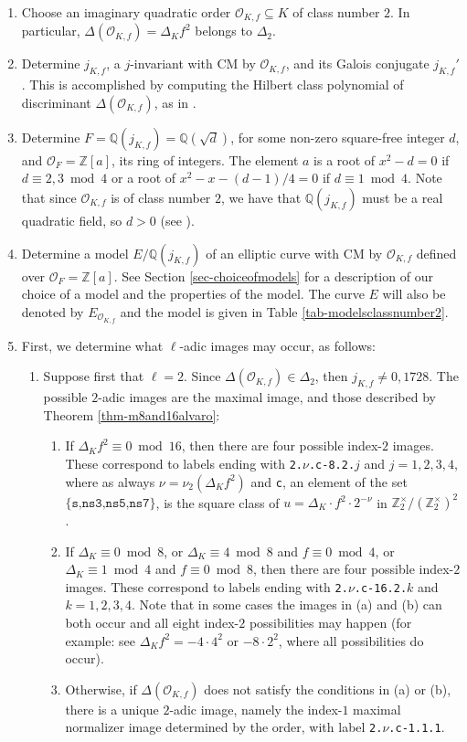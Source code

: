 \documentclass[11pt]{amsart}
\theoremstyle{definition}
\newcommand{\Q}{\mathbb Q}
\newcommand{\Z}{\mathbb Z}
\newcommand{\OF}{\mathcal{O}_F}
\newcommand{\Of}{\mathcal{O}_{K,f}}
\begin{document}
\begin{enumerate}
    \item Choose an imaginary quadratic order $\Of\subseteq K$ of class number $2$. In particular, $\Delta(\Of)=\Delta_K f^2$ belongs to $\Delta_2$.
    \item Determine $j_{K,f}$, a $j$-invariant with CM by $\Of$, and its Galois conjugate $j_{K,f}'$. This is accomplished by computing the Hilbert class polynomial of discriminant $\Delta(\Of)$, as in \cite[Section 7.6.2]{cohen}. 
    \item Determine $F=\Q(j_{K,f})=\Q(\sqrt{d})$, for some non-zero square-free integer $d$, and $\OF = \Z[a]$, its ring of integers. The element $a$ is a root of $x^2-d=0$ if $d\equiv 2,3\bmod 4$ or a root of $x^2-x-(d-1)/4=0$ if $d\equiv 1 \bmod 4$. Note that since $\Of$ is of class number $2$, we have that $\Q(j_{K,f})$ must be a real quadratic field, so $d > 0$ (see \cite[Exercise 2.9]{silverman2}).
    \item Determine a model $E/\Q(j_{K,f})$ of an elliptic curve with CM by $\Of$ defined over $\OF=\Z[a]$. See Section \ref{sec-choiceofmodels} for a description of our choice of a model and the properties of the model. The curve $E$ will also be denoted by $E_{\Of}$ and the model is given in Table \ref{tab-modelsclassnumber2}.
    \item First, we determine what $\ell$-adic images may occur, as follows:
    \begin{enumerate} 
    \item Suppose first that $\ell=2$. Since $\Delta(\Of)\in \Delta_2$, then $j_{K,f}\neq 0,1728$. The possible $2$-adic images are the maximal image, and those described by Theorem \ref{thm-m8and16alvaro}:
    \begin{enumerate}
        \item If $\Delta_K f^2 \equiv 0 \bmod 16$, then there are four possible index-$2$ images. These correspond to labels ending with \texttt{2.$\nu$.c-8.2.$j$} and $j=1,2,3,4$, where as always $\nu=\nu_2(\Delta_K f^2)$ and \texttt{c}, an element of the set $\{\texttt{s,ns3,ns5,ns7}\}$, is the square class of $u=\Delta_K\cdot f^2\cdot 2^{-\nu}$ in $\Z_2^\times/(\Z_2^\times)^2$.
        \item If $\Delta_K\equiv 0 \bmod 8$, or $\Delta_K\equiv 4 \bmod 8$ and $f\equiv 0 \bmod 4$, or $\Delta_K\equiv 1 \bmod 4$ and $f\equiv 0 \bmod 8$, then there are four possible index-$2$ images. These correspond to labels ending with \texttt{2.$\nu$.c-16.2.$k$} and $k=1,2,3,4$. Note that in some cases the images in (a) and (b) can both occur and all eight index-$2$ possibilities may happen (for example: see $\Delta_K f^2=-4\cdot 4^2$ or $-8\cdot 2^2$, where all possibilities do occur).
        \item Otherwise, if $\Delta(\Of)$ does not satisfy the conditions in (a) or (b), there is a unique $2$-adic image, namely the index-$1$ maximal normalizer image determined by the order, with label \texttt{2.$\nu$.c-1.1.1}. 
    \end{enumerate}


\end{enumerate}
\end{enumerate}
\end{document}
